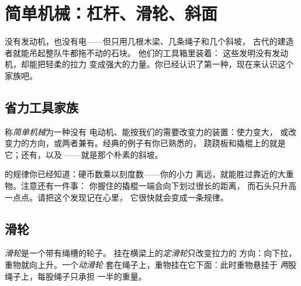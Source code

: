 \chapter{简单机械：杠杆、滑轮、斜面}\label{ch:g5:simple-machines}

没有发动机，也没有电——但只用几根木梁、几条绳子和几个斜坡，
古代的建造者就能吊起整队牛都拖不动的石块。
他们的工具箱里装着\emph{}：
这些发明没有发动机，却能把轻柔的拉力
变成强大的力量。你已经认识了第一种，现在来认识这个家族吧。

\section{省力工具家族}

\begin{definition}[简单机械]\label{def:g5:simple-machines:machine}
称\emph{简单机械}为一种没有
电动机、能按我们的需要改变力的装置：使力变大，
或改变力的方向，或两者兼有。经典的例子有你已熟悉的\emph{}，
跷跷板和撬棍上的就是它；还有\emph{}，以及
\emph{}——就是那个朴素的斜坡。
\end{definition}

\begin{example}[再看杠杆]\label{ex:g5:simple-machines:lever}
的规律你已经知道：硬币数乘以刻度数——你的小力
离远，就能胜过靠近的大重物。注意还有一件事：
你握住的撬棍一端会向下划过很长的距离，
而石头只升高一点点。请把这个发现记在心里，
它很快就会变成一条规律。
\end{example}

\section{滑轮}

\begin{definition}[滑轮]\label{def:g5:simple-machines:pulley}
\emph{滑轮}是一个带有绳槽的轮子。
挂在横梁上的\emph{定滑轮}只改变拉力的
方向：向下拉，重物就向上升。一个\emph{动滑轮}
套在绳子上，重物挂在它下面：此时重物悬挂于
\emph{两}股绳子上，每股绳子只承担
一半的重量。
\end{definition}

